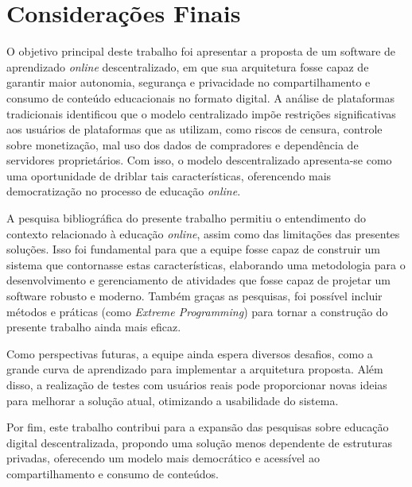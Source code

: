 \chapter[Considerações Finais]{Considerações Finais}
\label{cap:consideracoes}

O objetivo principal deste trabalho foi apresentar a proposta de um software de aprendizado \textit{online} descentralizado, em que sua arquitetura fosse capaz de garantir maior autonomia, segurança e privacidade no compartilhamento e consumo de conteúdo educacionais no formato digital. A análise de plataformas tradicionais identificou que o modelo centralizado impõe restrições significativas aos usuários de plataformas que as utilizam, como riscos de censura, controle sobre monetização, mal uso dos dados de compradores e dependência de servidores proprietários. Com isso, o modelo descentralizado apresenta-se como uma oportunidade de driblar tais características, oferencendo mais democratização no processo de educação \textit{online}.

A pesquisa bibliográfica do presente trabalho permitiu o entendimento do contexto relacionado à educação \textit{online}, assim como das limitações das presentes soluções. Isso foi fundamental para que a equipe fosse capaz de construir um sistema que contornasse estas características, elaborando uma metodologia para o desenvolvimento e gerenciamento de atividades que fosse capaz de projetar um software robusto e moderno. Também graças as pesquisas, foi possível incluir métodos e práticas (como \textit{Extreme Programming}) para tornar a construção do presente trabalho ainda mais eficaz.

Como perspectivas futuras, a equipe ainda espera diversos desafios, como a grande curva de aprendizado para implementar a arquitetura proposta. Além disso, a realização de testes com usuários reais pode proporcionar novas ideias para melhorar a solução atual, otimizando a usabilidade do sistema.

Por fim, este trabalho contribui para a expansão das pesquisas sobre educação digital descentralizada, propondo uma solução menos dependente de estruturas privadas, oferecendo um modelo mais democrático e acessível ao compartilhamento e consumo de conteúdos.
